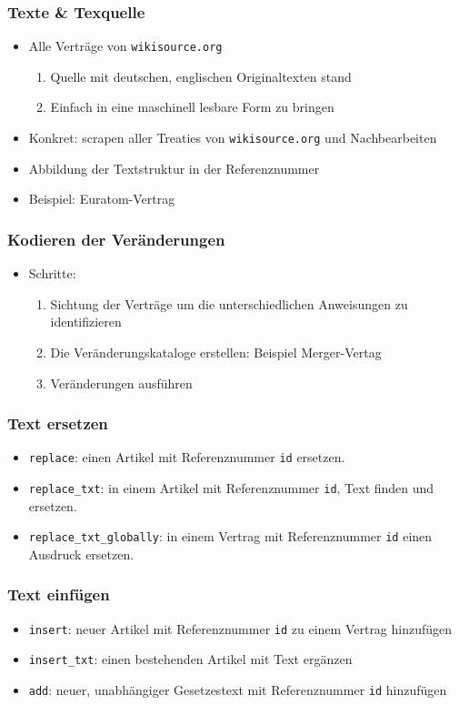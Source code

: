 \documentclass[xcolor=dvipsnames]{beamer} %
\begin{document}
\begin{frame}
  \frametitle{Texte \& Texquelle}
  \begin{itemize}
  \item Alle Verträge von \texttt{wikisource.org} 
    \begin{enumerate}
    \item Quelle mit deutschen, englischen Originaltexten stand
    \item Einfach in eine maschinell lesbare Form zu bringen
    \end{enumerate}
  \item Konkret: scrapen aller Treaties von \texttt{wikisource.org} und
    Nachbearbeiten
  \item Abbildung der Textstruktur in der Referenznummer
  \item Beispiel: Euratom-Vertrag
  \end{itemize}
\end{frame}

\begin{frame}
  \frametitle{Kodieren der Veränderungen}
  \begin{itemize}
  \item Schritte:
    \begin{enumerate}
    \item Sichtung der Verträge um die unterschiedlichen Anweisungen zu
      identifizieren
    \item Die Veränderungskataloge erstellen: Beispiel Merger-Vertag
    \item Veränderungen ausführen
    \end{enumerate}
  \end{itemize}
\end{frame}

\begin{frame}
  \frametitle{Text ersetzen}
  \begin{itemize}
  \item \texttt{replace}: einen Artikel mit Referenznummer \texttt{id}
    ersetzen.
  \item \texttt{replace\_txt}: in einem Artikel mit Referenznummer \texttt{id},
   Text finden und ersetzen.
 \item \texttt{replace\_txt\_globally}: in einem Vertrag mit Referenznummer
   \texttt{id} einen Ausdruck ersetzen.
  \end{itemize}
\end{frame}

\begin{frame}
  \frametitle{Text einfügen}
  \begin{itemize}
  \item \texttt{insert}: neuer Artikel mit Referenznummer \texttt{id} zu einem
    Vertrag hinzufügen
  \item \texttt{insert\_txt}: einen bestehenden Artikel mit Text ergänzen
  \item \texttt{add}: neuer, unabhängiger Gesetzestext mit Referenznummer
    \texttt{id} hinzufügen
  \end{itemize}
\end{frame}
\end{document}
